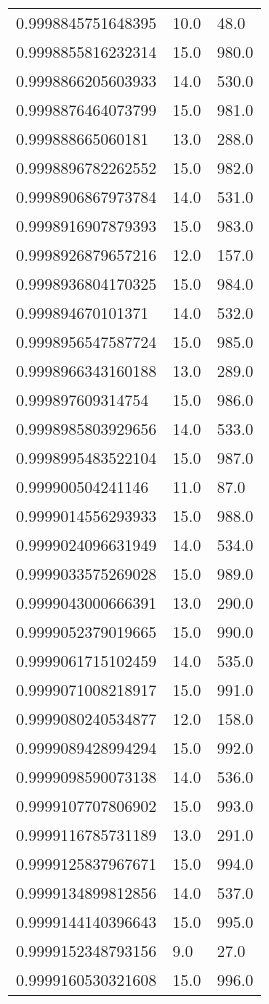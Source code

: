 \begin{center}
\begin{supertabular}[H]{p{0.30\textwidth}p{0.05\textwidth}p{0.05\textwidth}}
0.9998845751648395 & 10.0 & 48.0 \\ 
0.9998855816232314 & 15.0 & 980.0 \\ 
0.9998866205603933 & 14.0 & 530.0 \\ 
0.9998876464073799 & 15.0 & 981.0 \\ 
0.999888665060181 & 13.0 & 288.0 \\ 
0.9998896782262552 & 15.0 & 982.0 \\ 
0.9998906867973784 & 14.0 & 531.0 \\ 
0.9998916907879393 & 15.0 & 983.0 \\ 
0.9998926879657216 & 12.0 & 157.0 \\ 
0.9998936804170325 & 15.0 & 984.0 \\ 
0.999894670101371 & 14.0 & 532.0 \\ 
0.9998956547587724 & 15.0 & 985.0 \\ 
0.9998966343160188 & 13.0 & 289.0 \\ 
0.999897609314754 & 15.0 & 986.0 \\ 
0.9998985803929656 & 14.0 & 533.0 \\ 
0.9998995483522104 & 15.0 & 987.0 \\ 
0.999900504241146 & 11.0 & 87.0 \\ 
0.9999014556293933 & 15.0 & 988.0 \\ 
0.9999024096631949 & 14.0 & 534.0 \\ 
0.9999033575269028 & 15.0 & 989.0 \\ 
0.9999043000666391 & 13.0 & 290.0 \\ 
0.9999052379019665 & 15.0 & 990.0 \\ 
0.9999061715102459 & 14.0 & 535.0 \\ 
0.9999071008218917 & 15.0 & 991.0 \\ 
0.9999080240534877 & 12.0 & 158.0 \\ 
0.9999089428994294 & 15.0 & 992.0 \\ 
0.9999098590073138 & 14.0 & 536.0 \\ 
0.9999107707806902 & 15.0 & 993.0 \\ 
0.9999116785731189 & 13.0 & 291.0 \\ 
0.9999125837967671 & 15.0 & 994.0 \\ 
0.9999134899812856 & 14.0 & 537.0 \\ 
0.9999144140396643 & 15.0 & 995.0 \\ 
0.9999152348793156 & 9.0 & 27.0 \\ 
0.9999160530321608 & 15.0 & 996.0 \\ 

\end{supertabular}
\end{center}
